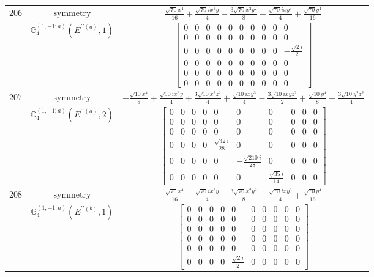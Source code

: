 \documentclass[fleqn,8pt,landscape]{jsarticle}
\begin{document}
\begin{longtable}{ccc}
$ 206 $ & $ \text{symmetry} $ & $ \frac{\sqrt{70} x^{4}}{16} + \frac{\sqrt{70} i x^{3} y}{4} - \frac{3 \sqrt{70} x^{2} y^{2}}{8} - \frac{\sqrt{70} i x y^{3}}{4} + \frac{\sqrt{70} y^{4}}{16} $ \\
$  $ & $ \mathbb{G}_{4}^{(1,-1;a)}(E^{\prime\prime(a)},1) $ & $ \begin{bmatrix} 0 & 0 & 0 & 0 & 0 & 0 & 0 & 0 & 0 & 0 \\ 0 & 0 & 0 & 0 & 0 & 0 & 0 & 0 & 0 & 0 \\ 0 & 0 & 0 & 0 & 0 & 0 & 0 & 0 & 0 & - \frac{\sqrt{2} i}{2} \\ 0 & 0 & 0 & 0 & 0 & 0 & 0 & 0 & 0 & 0 \\ 0 & 0 & 0 & 0 & 0 & 0 & 0 & 0 & 0 & 0 \\ 0 & 0 & 0 & 0 & 0 & 0 & 0 & 0 & 0 & 0 \end{bmatrix} $ \\ \hline
$ 207 $ & $ \text{symmetry} $ & $ - \frac{\sqrt{10} x^{4}}{8} + \frac{\sqrt{10} i x^{3} y}{4} + \frac{3 \sqrt{10} x^{2} z^{2}}{4} + \frac{\sqrt{10} i x y^{3}}{4} - \frac{3 \sqrt{10} i x y z^{2}}{2} + \frac{\sqrt{10} y^{4}}{8} - \frac{3 \sqrt{10} y^{2} z^{2}}{4} $ \\
$  $ & $ \mathbb{G}_{4}^{(1,-1;a)}(E^{\prime\prime(a)},2) $ & $ \begin{bmatrix} 0 & 0 & 0 & 0 & 0 & 0 & 0 & 0 & 0 & 0 \\ 0 & 0 & 0 & 0 & 0 & 0 & 0 & 0 & 0 & 0 \\ 0 & 0 & 0 & 0 & 0 & 0 & 0 & 0 & 0 & 0 \\ 0 & 0 & 0 & 0 & \frac{\sqrt{42} i}{28} & 0 & 0 & 0 & 0 & 0 \\ 0 & 0 & 0 & 0 & 0 & - \frac{\sqrt{210} i}{28} & 0 & 0 & 0 & 0 \\ 0 & 0 & 0 & 0 & 0 & 0 & \frac{\sqrt{35} i}{14} & 0 & 0 & 0 \end{bmatrix} $ \\ \hline
$ 208 $ & $ \text{symmetry} $ & $ \frac{\sqrt{70} x^{4}}{16} - \frac{\sqrt{70} i x^{3} y}{4} - \frac{3 \sqrt{70} x^{2} y^{2}}{8} + \frac{\sqrt{70} i x y^{3}}{4} + \frac{\sqrt{70} y^{4}}{16} $ \\
$  $ & $ \mathbb{G}_{4}^{(1,-1;a)}(E^{\prime\prime(b)},1) $ & $ \begin{bmatrix} 0 & 0 & 0 & 0 & 0 & 0 & 0 & 0 & 0 & 0 \\ 0 & 0 & 0 & 0 & 0 & 0 & 0 & 0 & 0 & 0 \\ 0 & 0 & 0 & 0 & 0 & 0 & 0 & 0 & 0 & 0 \\ 0 & 0 & 0 & 0 & 0 & 0 & 0 & 0 & 0 & 0 \\ 0 & 0 & 0 & 0 & 0 & 0 & 0 & 0 & 0 & 0 \\ 0 & 0 & 0 & 0 & \frac{\sqrt{2} i}{2} & 0 & 0 & 0 & 0 & 0 \end{bmatrix} $ \\ \hline

\end{longtable}
\end{document}
